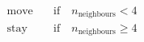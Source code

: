 \begin{align*}
    \text{move} & \quad \text{if} \quad n_\text{neighbours} < 4 \\
    \text{stay} & \quad \text{if} \quad n_\text{neighbours} \geq 4
\end{align*}
